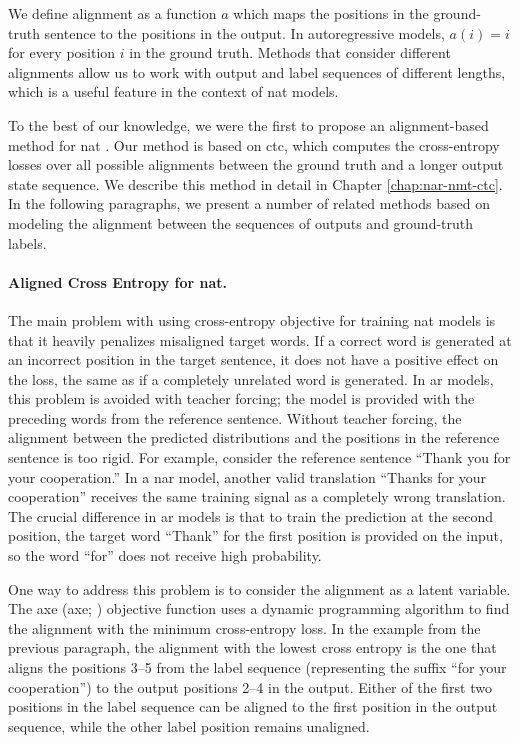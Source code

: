 We define alignment as a function $a$ which maps the positions in the
ground-truth sentence to the positions in the output. In autoregressive models,
$a(i) = i$ for every position $i$ in the ground truth. %
Methods that consider different alignments allow us to work with output and
label sequences of different lengths, which is a useful feature in the context
of \ac{nat} models.

To the best of our knowledge, we were the first to propose an alignment-based
method for \ac{nat} \citep{libovicky-helcl-2018-end}. Our method is based on
\acf{ctc}, which computes the cross-entropy losses over all
possible alignments between the ground truth and a longer output state
sequence. We describe this method in detail in Chapter \ref{chap:nar-nmt-ctc}.
In the following paragraphs, we present a number of related methods based on
modeling the alignment between the sequences of outputs and ground-truth
labels.

\paragraph{Aligned Cross Entropy for \ac{nat}.} The main problem with using
cross-entropy objective for training \ac{nat} models is that it heavily
penalizes misaligned target words. If a correct word is generated at an
incorrect position in the target sentence, it does not have a positive effect
on the loss, the same as if a completely unrelated word is generated. In
\acl{ar} models, this problem is avoided with teacher forcing; the model is
provided with the preceding words from the reference sentence. Without teacher
forcing, the alignment between the predicted distributions and the positions in
the reference sentence is too rigid. For example, consider the reference
sentence ``Thank you for your cooperation.'' In a \acl{nar} model, another
valid translation ``Thanks for your cooperation'' receives the same training
signal as a completely wrong translation. The crucial difference in \ac{ar}
models is that to train the prediction at the second position, the target word
``Thank'' for the first position is provided on the input, so the word ``for''
does not receive high probability.

One way to address this problem is to consider the alignment as a latent
variable.  The \acl{axe}  (\acs{axe};
\citealp{ghazvininejad2020aligned}) objective function uses a dynamic
programming algorithm to find the alignment with the minimum cross-entropy
loss. In the example from the previous paragraph, the alignment with the lowest
cross entropy is the one that aligns the positions 3--5 from the label sequence
(representing the suffix ``for your cooperation'') to the output positions 2--4
in the output. Either of the first two positions in the label sequence can be
aligned to the first position in the output sequence, while the other label
position remains unaligned.

